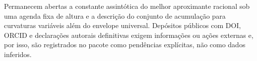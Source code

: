 Permanecem abertas a constante assintótica do melhor aproximante racional sob
uma agenda fixa de altura e a descrição do conjunto de acumulação para
curvaturas variáveis além do envelope universal. Depósitos públicos com DOI,
ORCID e declarações autorais definitivas exigem informações ou ações externas
e, por isso, são registrados no pacote como pendências explícitas, não como
dados inferidos.

